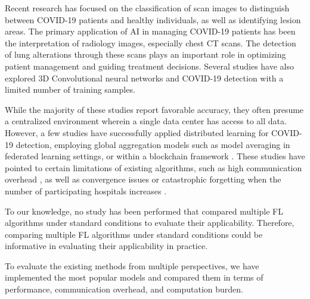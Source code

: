 Recent research has focused on the classification of scan images to distinguish between COVID-19 patients and healthy individuals, as well as identifying lesion areas. The primary application of AI in managing COVID-19 patients has been the interpretation of radiology images, especially chest CT scans.  The detection of lung alterations through these scans plays an important role in optimizing patient management and guiding treatment decisions\cite{yan2020interpretable}\cite{hu2020challenges}\cite{burian2020intensive}.  Several studies have also explored 3D Convolutional neural networks \cite{wang2020weakly} and COVID-19 detection with a limited number of training samples.

While the majority of these studies report favorable accuracy, they often presume a centralized environment wherein a single data center has access to all data. However, a few studies have successfully applied distributed learning for COVID-19 detection, employing global aggregation models such as model averaging in federated learning settings\cite{ho2022fedsgdcovid}\cite{zhang2021dynamic}, or within a blockchain framework \cite{kumar2021blockchain}. These studies have pointed to certain limitations of existing algorithms, such as high communication overhead \cite{remedios2020federated}, as well as convergence issues or catastrophic forgetting when the number of participating hospitals increases \cite{sheller2020federated} \cite{chang2018distributed}.


To our knowledge, no study has been performed that compared multiple FL algorithms under standard conditions to evaluate their applicability. Therefore, comparing multiple FL algorithms under standard conditions could be informative in evaluating their applicability in practice.

To evaluate the existing methods from multiple perspectives, we have implemented the most popular models and compared them in terms of performance, communication overhead, and computation burden.